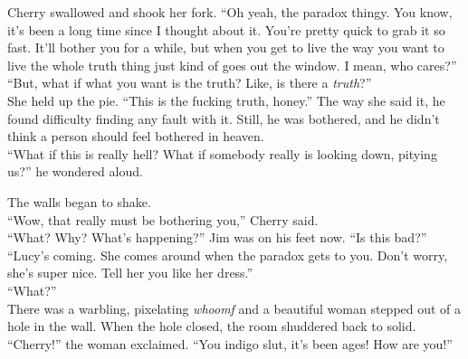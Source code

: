Cherry swallowed and shook her fork.  \enquote{Oh yeah, the paradox thingy.  You know, it's been a long time since I thought about it.  You're pretty quick to grab it so fast.  It'll bother you for a while, but when you get to live the way you want to live the whole truth thing just kind of goes out the window.  I mean, who cares?}\\



\enquote{But, what if what you want is the truth?  Like, is there a \textit{truth}?}\\



She held up the pie.  \enquote{This is the fucking truth, honey.}  The way she said it, he found difficulty finding any fault with it.  Still, he was bothered, and he didn't think a person should feel bothered in heaven.  \\



\enquote{What if this is really hell?  What if somebody really is looking down, pitying us?} he wondered aloud.\\


\asterism

The walls began to shake.\\



\enquote{Wow, that really must be bothering you,} Cherry said.\\



\enquote{What?  Why?  What's happening?}  Jim was on his feet now.  \enquote{Is this bad?}\\



\enquote{Lucy's coming.  She comes around when the paradox gets to you.  Don't worry, she's super nice.  Tell her you like her dress.}\\



\enquote{What?}\\



There was a warbling, pixelating \textit{whoomf}
 and a beautiful woman stepped out of a hole in the wall.  When the hole closed, the room shuddered back to solid.\\



\enquote{Cherry!} the woman exclaimed.  \enquote{You indigo slut, it's been ages!  How are you!}\\



